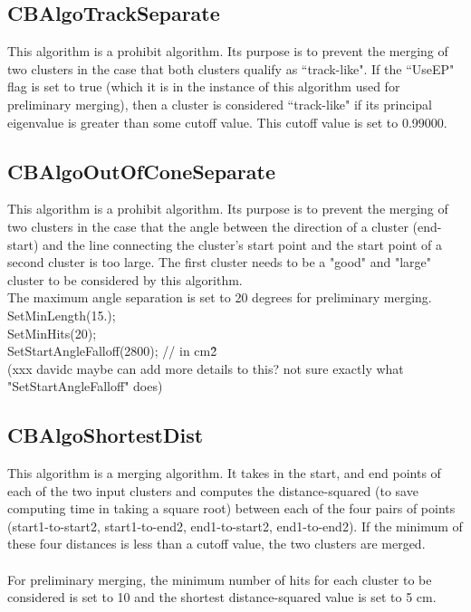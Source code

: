 \documentclass{article}
\begin{document}
\subsection{CBAlgoTrackSeparate}\label{sec:CBAlgoTrackSeparate}
This algorithm is a prohibit algorithm. Its purpose is to prevent the merging of two clusters in the case that both clusters qualify as ``track-like". If the ``UseEP" flag is set to true (which it is in the instance of this algorithm used for preliminary merging), then a cluster is considered ``track-like" if its principal eigenvalue is greater than some cutoff value. This cutoff value is set to 0.99000.


\subsection{CBAlgoOutOfConeSeparate}\label{sec:CBAlgoOutOfConeSeparate}
This algorithm is a prohibit algorithm. Its purpose is to prevent the merging of two clusters in the case that the angle between the direction of a cluster (end-start) and the line connecting the cluster's start point and the start point of a second cluster is too large. The first cluster needs to be a "good" and "large" cluster to be considered by this algorithm.\\

The maximum angle separation is set to 20 degrees for preliminary merging.\\
 SetMinLength(15.);\\
    SetMinHits(20);\\
    SetStartAngleFalloff(2800); // in cm\^2 \\
(xxx davidc maybe can add more details to this? not sure exactly what "SetStartAngleFalloff" does)
    
    
\subsection{CBAlgoShortestDist}\label{sec:CBAlgoShortestDist}
This algorithm is a merging algorithm. It takes in the start, and end points of each of the two input clusters and computes the distance-squared (to save computing time in taking a square root) between each of the four pairs of points (start1-to-start2, start1-to-end2, end1-to-start2, end1-to-end2). If the minimum of these four distances is less than a cutoff value, the two clusters are merged.\\\\
For preliminary merging, the minimum number of hits for each cluster to be considered is set to 10 and the shortest distance-squared value is set to 5 cm.
\end{document}

